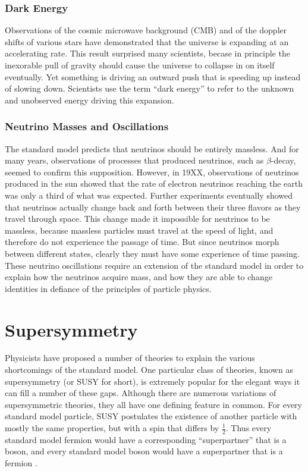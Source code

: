 \subsubsection*{Dark Energy}
Observations of the cosmic microwave background (CMB) and of the %
doppler shifts of various stars have demonstrated that the universe is
expanding at an accelerating rate. This result surprised many
scientists, becase in principle the inexorable pull of gravity should
cause the universe to collapse in on itself eventually. Yet something
is driving an outward push that is speeding up instead of slowing
down. Scientists use the term ``dark energy'' to refer to the unknown
and unobserved energy driving this expansion.

\subsubsection*{Neutrino Masses and Oscillations}
The standard model predicts that neutrinos should be entirely
massless. And for many years, observations of processes that produced
neutrinos, such as $\beta$-decay, seemed to confirm this
supposition. However, in 19XX, observations of neutrinos produced in %
the sun showed that the rate of electron neutrinos reaching the earth
was only a third of what was expected. Further experiments eventually
showed that neutrinos actually change back and forth between their three %
flavors as they travel through space. This change made it impossible
for neutrinos to be massless, because massless particles must travel
at the speed of light, and therefore do not experience the passage of
time. But since neutrinos morph between different states, clearly they
must have some experience of time passing. These neutrino
oscillations require an extension of the standard model in order to
explain how the neutrinos acquire mass, and how they are able to
change identities in defiance of the principles of particle physics.

\section{Supersymmetry}
\label{sec:susy}

Physicists have proposed a number of theories to explain the various
shortcomings of the standard model. One particular class of theories,
known as supersymmetry (or SUSY for short), is extremely popular for
the elegant ways it can fill a number of these gaps. Although there
are numerous variations of supersymmetric theories, they all have one
defining feature in common. For every standard model particle, SUSY
postulates the existence of another particle with mostly the same
properties, but with a spin that differs by $\frac{1}{2}$. Thus every standard model
fermion would have a corresponding ``superpartner'' that is a boson,
and every standard model boson would have a superpartner that is a
fermion \cite{susyprimer}.

